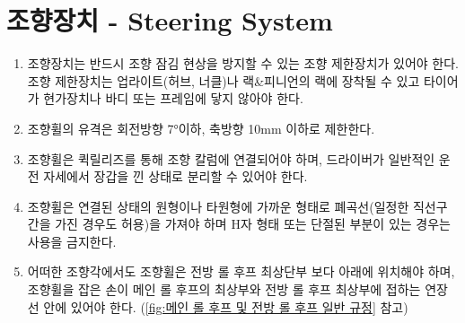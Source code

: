\documentclass[final,a4paper,10pt]{report}
\begin{document}
\section{조향장치 - Steering System}
\begin{enumerate}
  \item 조향장치는 반드시 조향 잠김 현상을 방지할 수 있는 조향 제한장치가 있어야 한다. 조향 제한장치는 업라이트(허브, 너클)나 랙\&피니언의 랙에 장착될 수 있고 타이어가 현가장치나 바디 또는 프레임에 닿지 않아야 한다.
  \item 조향휠의 유격은 회전방향 7°이하, 축방향 10mm 이하로 제한한다.
  \item 조향휠은 퀵릴리즈를 통해 조향 칼럼에 연결되어야 하며, 드라이버가 일반적인 운전 자세에서 장갑을 낀 상태로 분리할 수 있어야 한다.
  \item 조향휠은 연결된 상태의 원형이나 타원형에 가까운 형태로 폐곡선(일정한 직선구간을 가진 경우도 허용)을 가져야 하며 H자 형태 또는 단절된 부분이 있는 경우는 사용을 금지한다.
  \item 어떠한 조향각에서도 조향휠은 전방 롤 후프 최상단부 보다 아래에 위치해야 하며, 조향휠을 잡은 손이 메인 롤 후프의 최상부와 전방 롤 후프 최상부에 접하는 연장선 안에 있어야 한다. (\cref{fig:메인 롤 후프 및 전방 롤 후프 일반 규정} 참고)
\end{enumerate}
\end{document}
